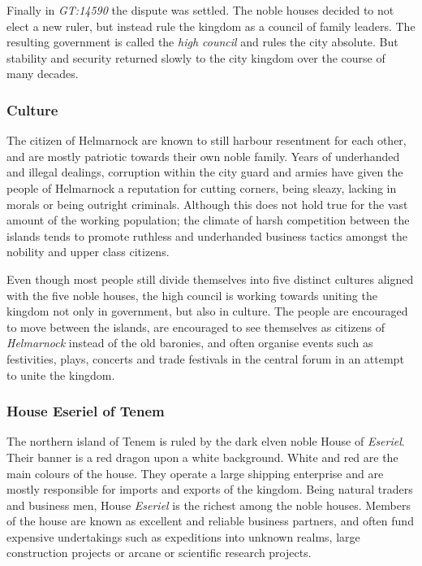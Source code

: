 Finally in \emph{GT:14590} the dispute was settled. The noble houses decided
to not elect a new ruler, but instead rule the kingdom as a council of family
leaders. The resulting government is called the \emph{high council} and rules
the city absolute. But stability and security returned slowly to the city
kingdom over the course of many decades.

\subsubsection*{Culture}


The citizen of Helmarnock are known to still harbour resentment for each other,
and are mostly patriotic towards their own noble family. Years of underhanded
and illegal dealings, corruption within the city guard and armies have given
the people of Helmarnock a reputation for cutting corners, being sleazy,
lacking in morals or being outright criminals. Although this does not hold
true for the vast amount of the working population; the climate of harsh
competition between the islands tends to promote ruthless and underhanded
business tactics amongst the nobility and upper class citizens.

Even though most people still divide themselves into five distinct cultures
aligned with the five noble houses, the high council is working towards
uniting the kingdom not only in government, but also in culture. The people
are encouraged to move between the islands, are encouraged to see themselves
as citizens of \emph{Helmarnock} instead of the old baronies, and often organise
events such as festivities, plays, concerts and trade festivals in the central
forum in an attempt to unite the kingdom.

\subsubsection*{House Eseriel of Tenem}

The northern island of Tenem is ruled by the dark elven noble House of
\emph{Eseriel}. Their banner is a red dragon upon a white background. White
and red are the main colours of the house. They operate a large shipping
enterprise and are mostly responsible for imports and exports of the
kingdom. Being natural traders and business men, House \emph{Eseriel} is the
richest among the noble houses. Members of the house are known as excellent
and reliable business partners, and often fund expensive undertakings such
as expeditions into unknown realms, large construction projects or arcane
or scientific research projects.

